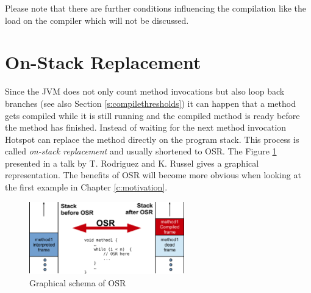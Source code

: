 Please note that there are further conditions influencing the compilation like the load on the compiler which will not be discussed.

\section{On-Stack Replacement}
\label{s:onstackreplacement}
Since the JVM does not only count method invocations but also loop back branches (see also Section \ref{s:compilethresholds}) it can happen that a method gets compiled while it is still running and the compiled method is ready before the method has finished.
Instead of waiting for the next method invocation Hotspot can replace the method directly on the program stack. This process is called \textit{on-stack replacement} and usually shortened to OSR. The Figure \ref{f:osr} presented in a talk by T. Rodriguez and K. Russel \cite{client_compiler_talk} gives a graphical representation.
The benefits of OSR will become more obvious when looking at the first example in Chapter \ref{c:motivation}.
\begin{figure}[ht]
  \begin{center}
    \centering
    \includegraphics[width=0.6\textwidth]{figures/osr.png}
    \caption{Graphical schema of OSR}
    \label{f:osr}
  \end{center}
\end{figure}

